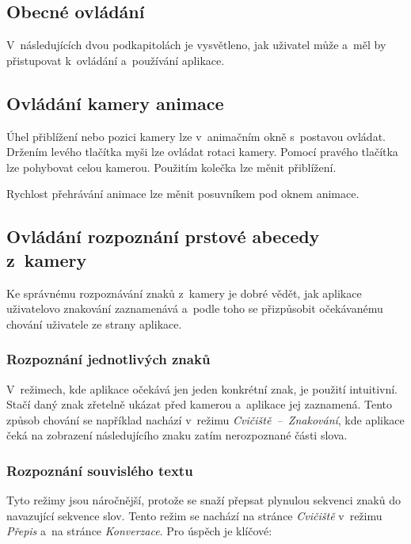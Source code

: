 \documentclass[
  master,
  program=ainfvs,
  biblatex,
  figures=true,
  tables=false,
  sourcecodes=true,
  glossaries,
  index
]{kidiplom}
\begin{document}
    \subsection{Obecné ovládání}
        V~následujících dvou podkapitolách je vysvětleno, jak uživatel může a~měl by přistupovat k~ovládání a~používání aplikace.
        
    \subsection{Ovládání kamery animace}
        Úhel přiblížení nebo pozici kamery lze v~animačním okně s~postavou ovládat. Držením levého tlačítka myši lze ovládat rotaci kamery. Pomocí pravého tlačítka lze pohybovat celou kamerou. Použitím kolečka lze měnit přiblížení.

        Rychlost přehrávání animace lze měnit posuvníkem pod oknem animace.

    \subsection{Ovládání rozpoznání prstové abecedy z~kamery}
        Ke správnému rozpoznávání znaků z~kamery je dobré vědět, jak aplikace uživatelovo znakování zaznamenává a~podle toho se přizpůsobit očekávanému chování uživatele ze strany aplikace.

        \subsubsection{Rozpoznání jednotlivých znaků}
            V~režimech, kde aplikace očekává jen jeden konkrétní znak, je použití intuitivní. Stačí daný znak zřetelně ukázat před kamerou a~aplikace jej zaznamená. Tento způsob chování se například nachází v~režimu \emph{Cvičiště~--~Znakování}, kde aplikace čeká na zobrazení následujícího znaku zatím nerozpoznané části slova.

        \subsubsection{Rozpoznání souvislého textu}
            Tyto režimy jsou náročnější, protože se snaží přepsat plynulou sekvenci znaků do navazující sekvence slov. Tento režim se nachází na stránce \emph{Cvičiště} v~režimu \emph{Přepis} a~na stránce \emph{Konverzace}. Pro úspěch je klíčové:
            
\end{document}
